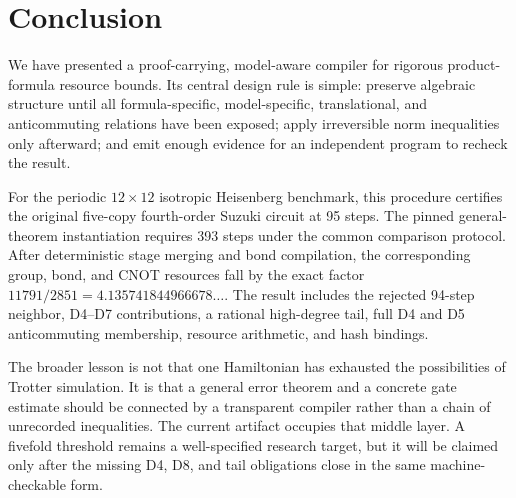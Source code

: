 \section{Conclusion}
\label{sec:conclusion}

We have presented a proof-carrying, model-aware compiler for rigorous
product-formula resource bounds.  Its central design rule is simple: preserve
algebraic structure until all formula-specific, model-specific, translational,
and anticommuting relations have been exposed; apply irreversible norm
inequalities only afterward; and emit enough evidence for an independent
program to recheck the result.

For the periodic $12\times12$ isotropic Heisenberg benchmark, this procedure
certifies the original five-copy fourth-order Suzuki circuit at 95 steps.  The
pinned general-theorem instantiation requires 393 steps under the common
comparison protocol.  After deterministic stage merging and bond
compilation, the corresponding group, bond, and CNOT resources fall by the
exact factor $11791/2851=4.135741844966678\ldots$.  The result includes the
rejected 94-step neighbor, D4--D7 contributions, a rational high-degree tail,
full D4 and D5 anticommuting membership, resource arithmetic, and hash
bindings.

The broader lesson is not that one Hamiltonian has exhausted the possibilities
of Trotter simulation.  It is that a general error theorem and a concrete gate
estimate should be connected by a transparent compiler rather than a chain of
unrecorded inequalities.  The current artifact occupies that middle layer.  A
fivefold threshold remains a well-specified research target, but it will be
claimed only after the missing D4, D8, and tail obligations close in the same
machine-checkable form.
